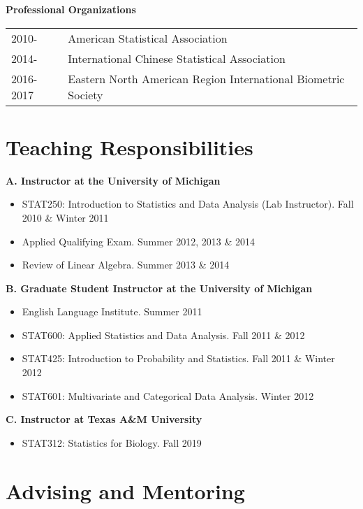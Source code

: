 \documentclass[10pt]{article}
\begin{document}
\textbf{Professional Organizations}

\begin{table}[H]
\hskip0.9cm\begin{tabular}{p{1.6cm}p{12cm}}
2010- & American Statistical Association\\
2014- & International Chinese Statistical Association\\
2016-2017 & Eastern North American Region International Biometric Society
\end{tabular}
\end{table}


\section*{Teaching Responsibilities}

\textbf{A. Instructor at the University of Michigan}
\begin{itemize} 
\item STAT250: Introduction to Statistics and Data Analysis (Lab Instructor). Fall 2010 \& Winter 2011
\item Applied Qualifying Exam. Summer 2012, 2013 \& 2014
\item Review of Linear Algebra. Summer 2013 \& 2014
\end{itemize}

\textbf{B. Graduate Student Instructor at the University of Michigan}
\begin{itemize}  
\item English Language Institute. Summer 2011
\item STAT600: Applied Statistics and Data Analysis. Fall 2011 \& 2012
\item STAT425: Introduction to Probability and Statistics. Fall 2011 \& Winter 2012
\item STAT601: Multivariate and Categorical Data Analysis. Winter 2012
\end{itemize}

\textbf{C. Instructor at Texas A\&M University}
\begin{itemize} 
\item STAT312: Statistics for Biology. Fall 2019
\end{itemize}

\section*{Advising and Mentoring}
\end{document}
